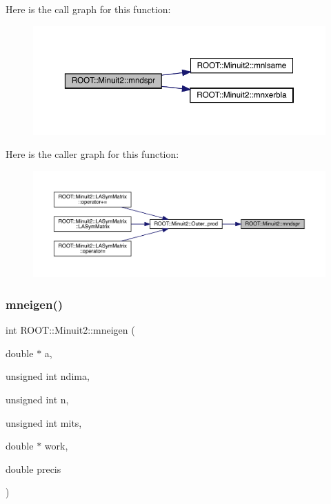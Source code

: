 Here is the call graph for this function\+:\nopagebreak
\begin{figure}[H]
\begin{center}
\leavevmode
\includegraphics[width=350pt]{d6/d3a/namespaceROOT_1_1Minuit2_acc89c3c759da8dc191d0a862e354a555_cgraph}
\end{center}
\end{figure}
Here is the caller graph for this function\+:\nopagebreak
\begin{figure}[H]
\begin{center}
\leavevmode
\includegraphics[width=350pt]{d6/d3a/namespaceROOT_1_1Minuit2_acc89c3c759da8dc191d0a862e354a555_icgraph}
\end{center}
\end{figure}
\mbox{\label{namespaceROOT_1_1Minuit2_a4a6b91c57b107c48f582569401bb12e9}} 
\subsubsection{\texorpdfstring{mneigen()}{mneigen()}}
{\footnotesize\ttfamily int R\+O\+O\+T\+::\+Minuit2\+::mneigen (\begin{DoxyParamCaption}\item[{double $\ast$}]{a,  }\item[{unsigned int}]{ndima,  }\item[{unsigned int}]{n,  }\item[{unsigned int}]{mits,  }\item[{double $\ast$}]{work,  }\item[{double}]{precis }\end{DoxyParamCaption})}

